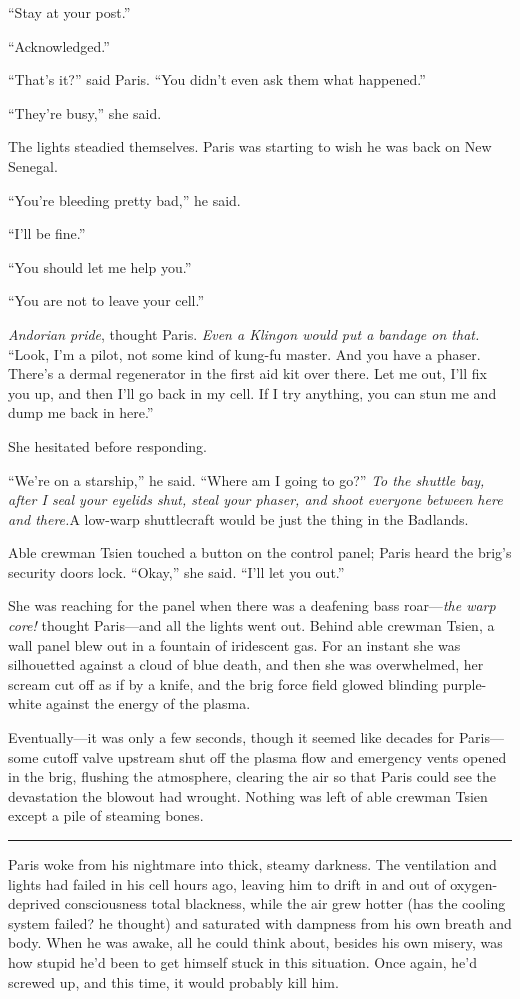 \documentclass[twoside,letterpaper,12pt]{memoir}
\begin{document}
``Stay at your post.''

``Acknowledged.''

``That's it?'' said Paris. ``You didn't even ask them what happened.''

``They're busy,'' she said.

The lights steadied themselves. Paris was starting to wish he was back on New Senegal.

``You're bleeding pretty bad,'' he said.

``I'll be fine.''

``You should let me help you.''

``You are not to leave your cell.''

\textit{Andorian pride}, thought Paris. \textit{Even a Klingon would put a bandage on that.} ``Look, I'm a pilot, not some kind of kung-fu master. And you have a phaser. There's a dermal regenerator in the first aid kit over there. Let me out, I'll fix you up, and then I'll go back in my cell. If I try anything, you can stun me and dump me back in here.''

She hesitated before responding.

``We're on a starship,'' he said. ``Where am I going to go?'' \textit{To the shuttle bay, after I seal your eyelids shut, steal your phaser, and shoot everyone between here and there.}A low-warp shuttlecraft would be just the thing in the Badlands.

Able crewman Tsien touched a button on the control panel; Paris heard the brig's security doors lock. ``Okay,'' she said. ``I'll let you out.''

She was reaching for the panel when there was a deafening bass roar---\textit{the warp core!} thought Paris---and all the lights went out. Behind able crewman Tsien, a wall panel blew out in a fountain of iridescent gas. For an instant she was silhouetted against a cloud of blue death, and then she was overwhelmed, her scream cut off as if by a knife, and the brig force field glowed blinding purple-white against the energy of the plasma.

Eventually---it was only a few seconds, though it seemed like decades for Paris---some cutoff valve upstream shut off the plasma flow and emergency vents opened in the brig, flushing the atmosphere, clearing the air so that Paris could see the devastation the blowout had wrought. Nothing was left of able crewman Tsien except a pile of steaming bones.

\fancybreak{\rule{3cm}{0.4 pt}}
Paris woke from his nightmare into thick, steamy darkness. The ventilation and lights had failed in his cell hours ago, leaving him to drift in and out of oxygen-deprived consciousness total blackness, while the air grew hotter (has the cooling system failed? he thought) and saturated with dampness from his own breath and body. When he was awake, all he could think about, besides his own misery, was how stupid he'd been to get himself stuck in this situation. Once again, he'd screwed up, and this time, it would probably kill him.
\end{document}
